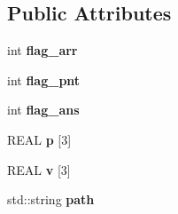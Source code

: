 \subsection*{Public Attributes}
\begin{DoxyCompactItemize}
\item 
\mbox{\label{class_scene3_d_ab54c7745997c7df67ef76749a872c83d}} 
int {\bfseries flag\+\_\+arr}
\item 
\mbox{\label{class_scene3_d_a9e8551cf83aaf3e1f0672f6236d67c48}} 
int {\bfseries flag\+\_\+pnt}
\item 
\mbox{\label{class_scene3_d_a2882d12ce31ae4697b8071e5fc9da116}} 
int {\bfseries flag\+\_\+ans}
\item 
\mbox{\label{class_scene3_d_af2245f2c6bca54e69ea5a4b7590710e5}} 
R\+E\+AL {\bfseries p} \mbox{[}3\mbox{]}
\item 
\mbox{\label{class_scene3_d_a6f8a9f79c1ab91110d4ed46ff744044b}} 
R\+E\+AL {\bfseries v} \mbox{[}3\mbox{]}
\item 
\mbox{\label{class_scene3_d_abdc28d46dadf3b57dc491dbcb5db2db2}} 
std\+::string {\bfseries path}
\end{DoxyCompactItemize}
